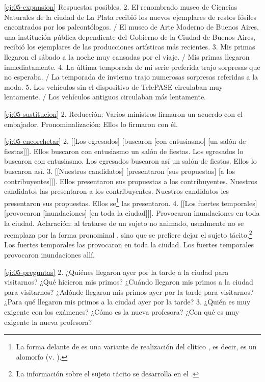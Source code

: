 \begin{solucion}{\ref{ej:05-expansion}}
Respuestas posibles. 2. El renombrado museo de Ciencias Naturales de la ciudad
de La Plata recibió los nuevos ejemplares de restos fósiles encontrados por los
paleontólogos. / El museo de Arte Moderno de Buenos Aires, una institución
pública dependiente del Gobierno de la Ciudad de Buenos Aires, recibió los
ejemplares de las producciones artísticas más recientes. 3. Mis primas llegaron
el sábado a la noche muy cansadas por el viaje. / Mis primas llegaron inmediatamente. 4. La última temporada de mi
serie preferida trajo sorpresas que no esperaba. / La temporada de invierno
trajo numerosas sorpresas referidas a la moda. 5. Los vehículos sin el
dispositivo de TelePASE circulaban muy lentamente. / Los vehículos antiguos
circulaban más lentamente.
\end{solucion}

\begin{solucion}{\ref{ej:05-sustitucion}}
2. Reducción: Varios ministros firmaron un acuerdo con el embajador.
Pronominalización: Ellos lo firmaron con él.
\end{solucion}

\begin{solucion}{\ref{ej:05-encorchetar}}
2. [[Los egresados] [buscaron [con entusiasmo] [un salón de fiestas]]]. Ellos
buscaron con entusiasmo un salón de fiestas. Los egresados lo buscaron con
entusiasmo. Los egresados buscaron así un salón de fiestas. Ellos lo buscaron
así. 3. [[Nuestros candidatos] [presentaron [sus propuestas] [a los
contribuyentes]]]. Ellos presentaron sus propuestas a los contribuyentes.
Nuestros candidatos las presentaron a los contribuyentes. Nuestros candidatos
les presentaron sus propuestas. Ellos se\footnote{\label{fn:05-se}La forma
 delante de  es una variante de realización del clítico
, es decir, es un alomorfo (v. ).} las presentaron. 4. [[Los
fuertes temporales] [provocaron [inundaciones] [en toda la ciudad]]].
Provocaron inundaciones en toda la ciudad. Aclaración: al tratarse de un sujeto
no animado, usualmente no se reemplaza por la forma pronominal ,
sino que se prefiere dejar el sujeto tácito.\footnote{La información sobre el
sujeto tácito se desarrolla en el .} Los fuertes temporales las
provocaron en toda la ciudad. Los fuertes temporales provocaron inundaciones
allí.
\end{solucion}

\begin{solucion}{\ref{ej:05-preguntas}}
2. ¿Quiénes llegaron ayer por la tarde a la ciudad para visitarnos? ¿Qué
hicieron mis primos? ¿Cuándo llegaron mis primos a la ciudad para visitarnos?
¿Adónde llegaron mis primos ayer por la tarde para visitarnos? ¿Para qué
llegaron mis primos a la ciudad ayer por la tarde? 3. ¿Quién es muy exigente con
los exámenes? ¿Cómo es la nueva profesora? ¿Con qué es muy exigente la nueva
profesora?
\end{solucion}

